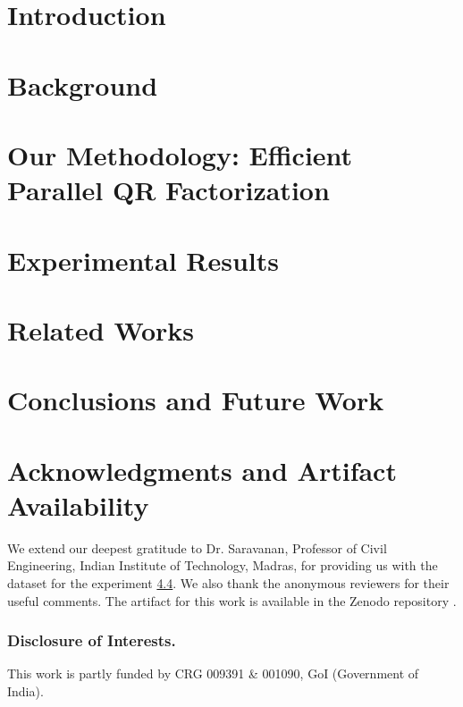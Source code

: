 \documentclass[runningheads]{llncs}
\begin{document}
\section{Introduction}
\label{sec:intro}


\section{Background}
\label{sec:bkgd}



\section{Our Methodology: Efficient Parallel QR Factorization}
\label{sec:meth}


\section{Experimental Results}
\label{sec:expts}
 

\section{Related Works}
\label{sec:related}


\section{Conclusions and Future Work}
\label{sec:conc}


\section{Acknowledgments and Artifact Availability}
We extend our deepest gratitude to Dr. Saravanan, Professor of Civil Engineering, Indian Institute of Technology, Madras, for providing us  with the dataset for the experiment \hyperref[exp:exp4]{4.4}. We also thank the anonymous reviewers for their useful comments. The artifact for this work is available in the Zenodo repository \cite{soumyajit_chatterjee_2025_15602262}.

\small \subsubsection{Disclosure of Interests.} This work is partly funded by CRG 009391 \& 001090, GoI (Government of India).

%
%

%
%
\printbibliography
\end{document}
